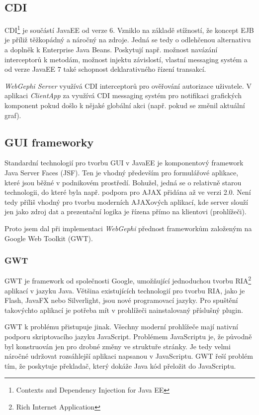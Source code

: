 \documentclass[thesis=M,czech]{FITthesis}[2014/05/6]
\begin{document}
\subsection{CDI}
CDI\footnote{Contexts and Dependency Injection for Java EE\cite{cdi}} je součástí JavaEE od verze 6. Vzniklo na základě stížností, že koncept EJB je příliž těžkopádný a náročný na zdroje. Jedná se tedy o odlehčenou alternativu a doplněk k Enterprise Java Beans.
Poskytují např. možnost navázání interceptorů k metodám, možnost injektu závislostí, vlastní messaging systém a od verze JavaEE 7 také schopnost deklarativného řízení transakcí.

\textit{WebGephi Server} využívá CDI interceptorů pro ověřování autorizace uživatele. V aplikaci \textit{ClientApp} za využívá CDI messaging systém pro notifikaci grafických komponent pokud 
došlo k nějaké globální akci (např. pokud se změnil aktuální graf).

\subsection{GUI frameworky}
Standardní technologií pro tvorbu GUI v JavaEE je komponentový framework Java Server Faces (JSF). Ten je vhodný především pro formulářové aplikace, které jsou běžné
v podnikovém prostředí. Bohužel, jedná se o relativně starou technologii, do které byla např. podpora pro AJAX přidána až ve verzi 2.0. 
Není tedy příliš vhodný pro tvorbu moderních AJAXových aplikací, kde server slouží jen jako zdroj dat a prezentační logika je řízena přímo na klientovi (prohlížeči).

Proto jsem dal při implementaci \textit{WebGephi} přednost frameworkům založeným na Google Web Toolkit (GWT)\cite{gwt}\cite{gwt-in-action}.

\subsubsection{GWT}
GWT je framework od společnosti Google, umožňující jednoduchou tvorbu RIA\footnote{Rich Internet Application} aplikací v jazyku Java. 
Většina existujících technologií pro tvorbu RIA, jako je Flash, JavaFX nebo Silverlight, jsou nové programovací jazyky. 
Pro spuštění takovýchto aplikací je potřeba mít v prohlížeči nainstalovaný příslušný plugin.

GWT k problému přistupuje jinak. Všechny moderní prohlížeče mají nativní podporu skriptovacího jazyku JavaScript.
 Problémem JavaScriptu je, že původně byl konstruován jen pro drobné změny ve struktuře stránky. Je tedy velmi náročné udržovat 
 rozsáhlejší aplikaci napsanou v JavaScriptu. GWT řeší problém tím, že poskytuje překladač, který dokáže Java kód přeložit do JavaScriptu.
\end{document}
